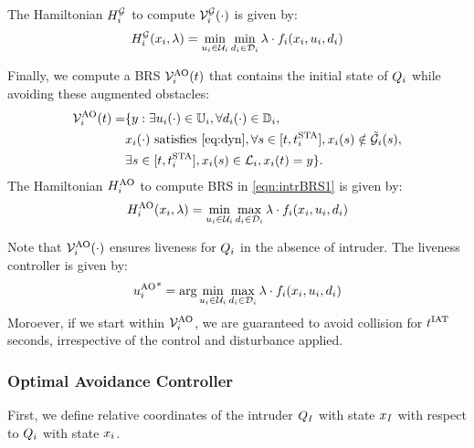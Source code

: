 The Hamiltonian $H^{\mathcal{G}}_{i}$ to compute $\mathcal{V}^{\mathcal{G}}_{i}(\cdot)$ is given by:
\begin{equation} \label{eqn:BRS_obsham}
\ham^{\mathcal{G}}_{i}(\state_i, \costate) = \min_{\ctrl_i \in \cset_i} \min_{\dstb_i \in \dset_i} \costate \cdot f_i (\state_i, \ctrl_i, \dstb_i)
\end{equation}

Finally, we compute a BRS $\mathcal{V}^{\text{AO}}_{i}(t)$ that contains the initial state of $Q_i$ while avoiding these augmented obstacles:
\begin{equation} \label{eqn:intrBRS1}
\begin{aligned}
\brs^{\text{AO}}_{i}(t) = & \{y: \exists \ctrl_i(\cdot) \in \cfset_i, \forall \dstb_i(\cdot) \in \dfset_i, \\
& \state_i(\cdot) \text{ satisfies \eqref{eq:dyn}}, \forall s \in [t, \sta_i], \state_i(s) \notin \tilde\obsset_i(s), \\
& \exists s \in [t, \sta_i], \state_i(s) \in \targetset_i, \state_i(t) = y \}.
\end{aligned}
\end{equation}
The Hamiltonian $H^{\text{AO}}_{i}$ to compute BRS in \eqref{eqn:intrBRS1} is given by:
\begin{equation} \label{eqn:BRSham}
\ham^{\text{AO}}_{i}(\state_i, \costate) = \min_{\ctrl_i \in \cset_i} \max_{\dstb_i \in \dset_i} \costate \cdot f_i (\state_i, \ctrl_i, \dstb_i)
\end{equation}

Note that $\mathcal{V}^{\text{AO}}_{i}(\cdot)$ ensures liveness for $Q_i$ in the absence of intruder. The liveness controller is given by:
\begin{equation}
{u^{\text{AO}}_{i}}^* = \arg \min_{u_i \in \mathcal{U}_i} \max_{d_i \in \mathcal{D}_i} \lambda \cdot f_i (x_i, u_i, d_i)
\end{equation}
Moroever, if we start within $\mathcal{V}^{\text{AO}}_{i}$, we are guaranteed to avoid collision for $t^\text{IAT}$ seconds, irrespective of the control and disturbance applied. 

\subsubsection{Optimal Avoidance Controller \label{sec:intruder_avoid}}
First, we define relative coordinates of the intruder $Q_{I}$ with state $x_I$ with respect to $Q_i$ with state $x_i$.

